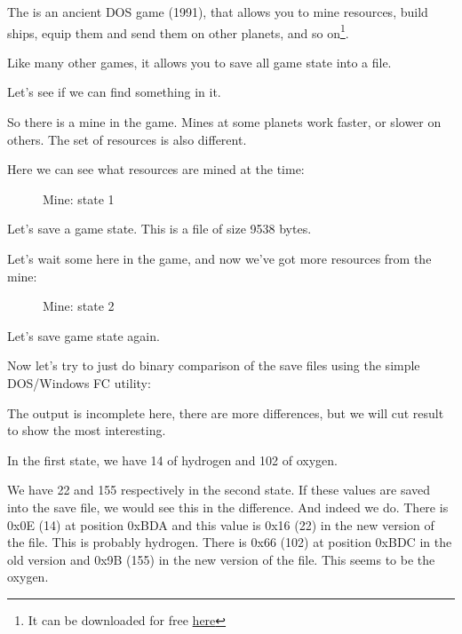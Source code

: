 ﻿
\label{Millenium_DOS_game}

The  
is an ancient DOS game (1991), that allows you to mine resources, build ships,
equip them and send them on other planets, and so on\footnote{It can be downloaded for free
\href{http://thehouseofgames.org/index.php?t=10&id=110}{here}}.

Like many other games, it allows you to save all game state into a file.

Let's see if we can find something in it.

\clearpage
So there is a mine in the game.
Mines at some planets 
work faster, or slower on others. 
The set of resources is also different.

Here we can see what resources are mined at the time: 

\begin{figure}[H]
\centering
{}
\caption{Mine: state 1}
\label{fig:mill_1}
\end{figure}

Let's save a game state.
This is a file of size 9538 bytes.

Let's wait some  here in the game, and now we've got more resources from the mine:

\begin{figure}[H]
\centering
{}
\caption{Mine: state 2}
\label{fig:mill_2}
\end{figure}

Let's save game state again.

Now let's try to just do binary comparison of the save files using the simple DOS/Windows FC utility:



The output is incomplete here, there are more differences, but we will cut result to show the most interesting.

In the first state, we have 14  of hydrogen and 102  of oxygen.

We have 22 and 155  respectively in the second state.
If these values are saved into 
the save file, we would see this in the difference.
And indeed we do. 
There is 0x0E (14) at position 0xBDA and this value is 
0x16 (22) in the new version of the file.
This is probably hydrogen.
There is 0x66 (102) at position 0xBDC in the old 
version and 0x9B (155) in the new version of the file. 
This seems to be the oxygen.

